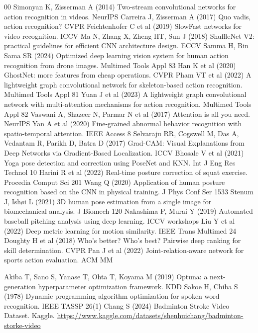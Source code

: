 \documentclass[pdflatex,sn-mathphys-num]{sn-jnl}
\theoremstyle{thmstyleone}%
\theoremstyle{thmstyletwo}%
\theoremstyle{thmstylethree}%
\begin{document}
\begin{thebibliography}{00}
 Simonyan K, Zisserman A (2014) Two-stream convolutional networks for action recognition in videos. NeurIPS
 Carreira J, Zisserman A (2017) Quo vadis, action recognition? CVPR
 Feichtenhofer C et al (2019) SlowFast networks for video recognition. ICCV
 Ma N, Zhang X, Zheng HT, Sun J (2018) ShuffleNet V2: practical guidelines for efficient CNN architecture design. ECCV
 Samma H, Bin Sama SR (2024) Optimized deep learning vision system for human action recognition from drone images. Multimed Tools Appl 83
 Han K et al (2020) GhostNet: more features from cheap operations. CVPR
 Pham VT et al (2022) A lightweight graph convolutional network for skeleton-based action recognition. Multimed Tools Appl 81
 Yuan J et al (2023) A lightweight graph convolutional network with multi-attention mechanisms for action recognition. Multimed Tools Appl 82
 Vaswani A, Shazeer N, Parmar N et al (2017) Attention is all you need. NeurIPS
 Yan A et al (2020) Fine-grained abnormal behavior recognition with spatio-temporal attention. IEEE Access 8
 Selvaraju RR, Cogswell M, Das A, Vedantam R, Parikh D, Batra D (2017) Grad-CAM: Visual Explanations from Deep Networks via Gradient-Based Localization. ICCV
 Bhosale V et al (2021) Yoga pose detection and correction using PoseNet and KNN. Int J Eng Res Technol 10
 Harini R et al (2022) Real-time posture correction of squat exercise. Procedia Comput Sci 201
 Wang Q (2020) Application of human posture recognition based on the CNN in physical training. J Phys Conf Ser 1533
 Stenum J, Ish\o i L (2021) 3D human pose estimation from a single image for biomechanical analysis. J Biomech 120
 Nakashima P, Murai Y (2019) Automated baseball pitching analysis using deep learning. ICCV workshops
 Liu Y et al (2022) Deep metric learning for motion similarity. IEEE Trans Multimed 24
 Doughty H et al (2018) Who's better? Who's best? Pairwise deep ranking for skill determination. CVPR
 Pan J et al (2022) Joint-relation-aware network for sports action evaluation. ACM MM

 Akiba T, Sano S, Yanase T, Ohta T, Koyama M (2019) Optuna: a next-generation hyperparameter optimization framework. KDD
 Sakoe H, Chiba S (1978) Dynamic programming algorithm optimization for spoken word recognition. IEEE TASSP 26(1)
 Chang S (2024) Badminton Stroke Video Dataset. Kaggle. \url{https://www.kaggle.com/datasets/shenhuichang/badminton-storke-video}

\end{thebibliography}
\end{document}
